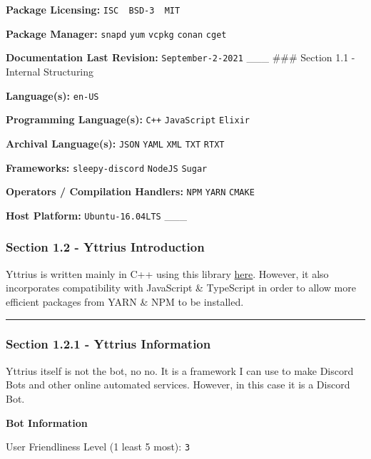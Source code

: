 \textbf{Package Licensing:}
\texttt{ISC\ \textbar{}\ BSD-3\ \textbar{}\ MIT}

\textbf{Package Manager:} \texttt{snapd} \texttt{yum} \texttt{vcpkg}
\texttt{conan} \texttt{cget}

\textbf{Documentation Last Revision:} \texttt{September-2-2021} \_\_\_
\#\#\# Section 1.1 - Internal Structuring

\textbf{Language(s):} \texttt{en-US}

\textbf{Programming Language(s):} \texttt{C++} \texttt{JavaScript}
\texttt{Elixir}

\textbf{Archival Language(s):} \texttt{JSON} \texttt{YAML} \texttt{XML}
\texttt{TXT} \texttt{RTXT}

\textbf{Frameworks:} \texttt{sleepy-discord} \texttt{NodeJS}
\texttt{Sugar}

\textbf{Operators / Compilation Handlers:} \texttt{NPM} \texttt{YARN}
\texttt{CMAKE}

\textbf{Host Platform:} \texttt{Ubuntu-16.04LTS} \_\_\_

\hypertarget{section-1.2---yttrius-introduction}{%
\subsubsection{Section 1.2 - Yttrius
Introduction}\label{section-1.2---yttrius-introduction}}

Yttrius is written mainly in C++ using this library
\href{https://github.com/yourWaifu/sleepy-discord}{here}. However, it
also incorporates compatibility with JavaScript \& TypeScript in order
to allow more efficient packages from YARN \& NPM to be installed.

\begin{center}\rule{0.5\linewidth}{0.5pt}\end{center}

\hypertarget{section-1.2.1---yttrius-information}{%
\subsubsection{Section 1.2.1 - Yttrius
Information}\label{section-1.2.1---yttrius-information}}

Yttrius itself is not the bot, no no. It is a framework I can use to
make Discord Bots and other online automated services. However, in this
case it is a Discord Bot.

\textbf{Bot Information}

User Friendliness Level (1 least 5 most): \texttt{3}

